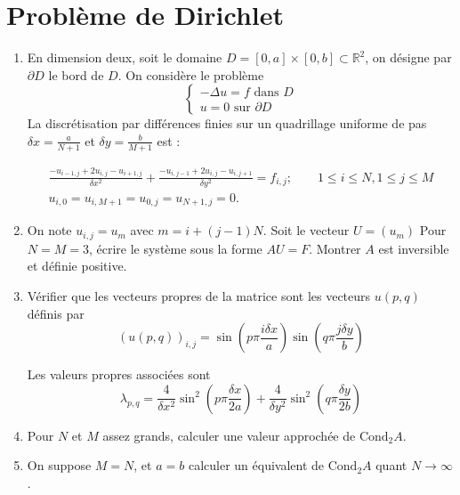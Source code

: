 \documentclass[a4paper]{article}
\begin{document}
\section{Problème de Dirichlet}
\begin{enumerate}
\item En dimension deux, soit le domaine  $D = [0, a] \times [0, b]\subset \mathbb{R}^2$, on désigne par $\partial D$ le bord de $D$. On considère le
problème
\[\left\{\begin{array}{l}
-\Delta u = f \mbox{ dans }D\\
u =0 \mbox{ sur }\partial D
\end{array}\right.
\]
La discrétisation par différences finies sur un quadrillage uniforme de pas $\delta x = \frac{a}{N+1}$ et $\delta y = \frac{b}{M+1}$
est : 

\begin{equation}
\begin{array}{l}
\displaystyle \frac {-u_{i-1,j} + 2u_{i,j}-u_{i+1,j}}{\delta x^2} +
\frac {-u_{i,j-1} + 2u_{i,j}-u_{i,j+1}}{\delta y^2}= f_{i,j} ;
 \qquad 1 \leq i  \leq N, 1 \leq j  \leq M \\
u_{i,0} = u_{i,M+1} = u_{0,j} = u_{N+1,j}=0.
\end{array}
\end{equation}

\item On note $u_{i,j}=u_m$ avec $m = i + (j-1)N$. Soit le vecteur $U = (u_m)$  Pour $N = M = 3$, écrire le système
sous la forme $AU = F$. Montrer $A$ est inversible et définie positive.
\item Vérifier que les vecteurs propres de la matrice sont les vecteurs $u(p,q)$ définis par
\[(u(p,q))_{i,j} = \sin\left(p\pi \frac{i\delta x}{a}\right)\sin\left(q\pi \frac{j\delta y}{b}\right)
\]

Les valeurs propres associées sont
\[\lambda_{p,q} =\frac 4{\delta x^2} \sin^2\left(p\pi \frac{\delta x}{2a}\right)+\frac 4{\delta y^2} \sin^2\left(q\pi \frac{\delta y}{2b}\right)\]

\item Pour $N$ et $M$ assez grands, calculer une valeur approchée de $\mbox{Cond}_2A$.
\item On suppose $M=N$, et $a=b$ calculer un équivalent de  $\mbox{Cond}_2A$ quant $N\to \infty$.

\end{enumerate}
\end{document}
